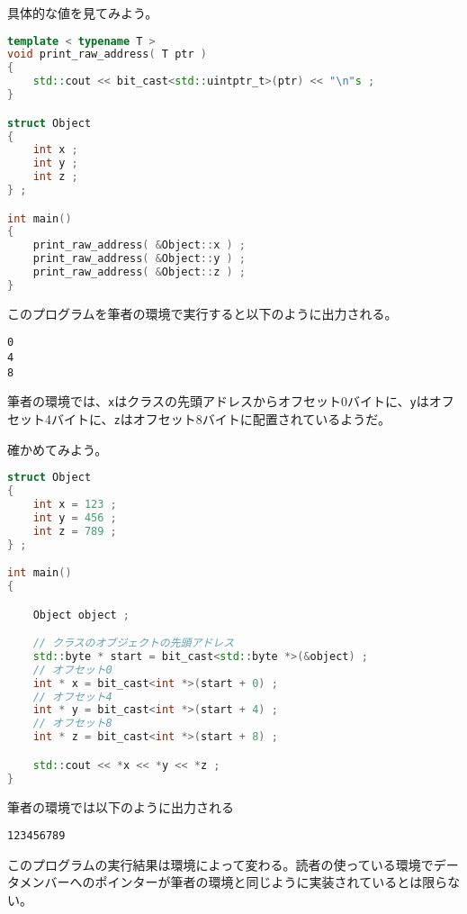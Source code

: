 具体的な値を見てみよう。

\begin{lstlisting}[language={C++}]
template < typename T >
void print_raw_address( T ptr )
{
    std::cout << bit_cast<std::uintptr_t>(ptr) << "\n"s ;
}

struct Object
{
    int x ;
    int y ;
    int z ;
} ;

int main()
{
    print_raw_address( &Object::x ) ;
    print_raw_address( &Object::y ) ;
    print_raw_address( &Object::z ) ;
}
\end{lstlisting}

\ifTombow\pagebreak\fi
このプログラムを筆者の環境で実行すると以下のように出力される。

\begin{lstlisting}[style=terminal]
0
4
8
\end{lstlisting}

筆者の環境では、\texttt{x}はクラスの先頭アドレスからオフセット0バイトに、\texttt{y}はオフセット4バイトに、\texttt{z}はオフセット8バイトに配置されているようだ。

確かめてみよう。

\begin{lstlisting}[language={C++}]
struct Object
{
    int x = 123 ;
    int y = 456 ;
    int z = 789 ;
} ;

int main()
{

    Object object ;

    // クラスのオブジェクトの先頭アドレス
    std::byte * start = bit_cast<std::byte *>(&object) ;
    // オフセット0
    int * x = bit_cast<int *>(start + 0) ;
    // オフセット4
    int * y = bit_cast<int *>(start + 4) ;
    // オフセット8
    int * z = bit_cast<int *>(start + 8) ;

    std::cout << *x << *y << *z ;
}
\end{lstlisting}

筆者の環境では以下のように出力される

\begin{lstlisting}[style=terminal]
123456789
\end{lstlisting}

このプログラムの実行結果は環境によって変わる。読者の使っている環境でデータメンバーへのポインターが筆者の環境と同じように実装されているとは限らない。
